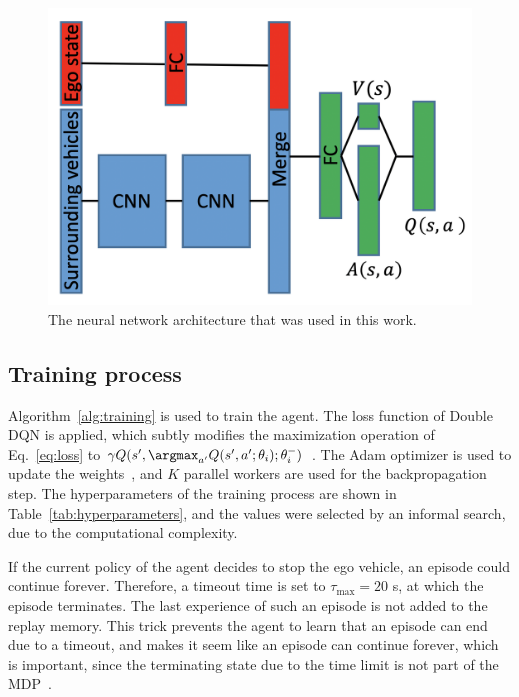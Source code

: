 \begin{figure}[!t]
	\centering
		\includegraphics[width=0.99\columnwidth]{figures/network_architecture.png}
		\caption{The neural network architecture that was used in this work.}
	\label{fig:neuralNetworkArchitecture}
\end{figure}

\subsection{Training process}

Algorithm~\ref{alg:training} is used to train the agent. The loss function of Double DQN is applied, which subtly modifies the maximization operation of Eq.~\ref{eq:loss} to $\gamma Q(s',\argmax_{a'} Q(s',a';\theta_i);\theta_i^-)$~\cite{Hasselt2016}. 
The Adam optimizer is used to update the weights~\cite{Kingma2014}, and $K$ parallel workers are used for the backpropagation step. The hyperparameters of the training process are shown in Table~\ref{tab:hyperparameters}, and the values were selected by an informal search, due to the computational complexity.

If the current policy of the agent decides to stop the ego vehicle, an episode could continue forever. Therefore, a timeout time is set to $\tau_\mathrm{max}=20$ s, at which the episode terminates. The last experience of such an episode is not added to the replay memory.
This trick prevents the agent to learn that an episode can end due to a timeout, and makes it seem like an episode can continue forever, which is important, since the terminating state due to the time limit is not part of the MDP~\cite{Hoel2018}.



